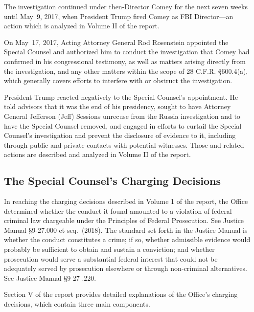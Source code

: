 The investigation continued under then-Director Comey for the next seven weeks until May~9, 2017, when President Trump fired Comey as FBI Director---an action which is analyzed in Volume II of the report.

On May~17, 2017, Acting Attorney General Rod Rosenstein appointed the Special Counsel and authorized him to conduct the investigation that Comey had confirmed in his congressional testimony, as well as matters arising directly from the investigation, and any other matters within the scope of 28 C.F.R. \S 600.4(a), which generally covers efforts to interfere with or obstruct the investigation.

President Trump reacted negatively to the Special Counsel's appointment.
He told advisors that it was the end of his presidency, sought to have Attorney General Jefferson (Jeff) Sessions unrecuse from the Russia investigation and to have the Special Counsel removed, and engaged in efforts to curtail the Special Counsel's investigation and prevent the disclosure of evidence to it, including through public and private contacts with potential witnesses.
Those and related actions are described and analyzed in Volume II of the report.

\hr

\subsection*{The Special Counsel's Charging Decisions}

In reaching the charging decisions described in Volume 1 of the report, the Office determined whether the conduct it found amounted to a violation of federal criminal law chargeable under the Principles of Federal Prosecution.
See Justice Manual \S 9-27.000 et seq.\ (2018).
The standard set forth in the Justice Manual is whether the conduct constitutes a crime; if so, whether admissible evidence would probably be sufficient to obtain and sustain a conviction; and whether prosecution would serve a substantial federal interest that could not be adequately served by prosecution elsewhere or through non-criminal alternatives.
See Justice Manual \S 9-27 .220.

Section V of the report provides detailed explanations of the Office's charging decisions, which contain three main components.

